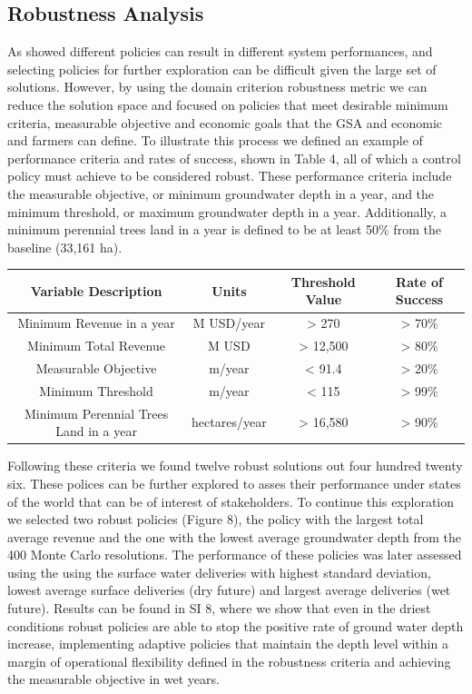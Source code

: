 \documentclass[11pt,a4paper]{article}
\begin{document}
\subsection{Robustness Analysis}

As showed different policies can result in different system performances, and selecting policies for further exploration can be difficult given the large set of solutions. However, by using the domain criterion robustness metric we can reduce the solution space and focused on policies that meet desirable minimum criteria, measurable objective and economic goals that the GSA and economic and farmers can define. To illustrate this process we defined an example of performance criteria and rates of success, shown in Table 4, all of which a control policy must achieve to be considered robust. These performance criteria include the measurable objective, or minimum groundwater depth in a year, and the minimum threshold, or maximum groundwater depth in a year. Additionally, a minimum perennial trees land in a year is defined to be at least 50\% from the baseline (33,161 ha). 

\begin{center}
\begin{tabular}{ |c|c|c|c| }
 \hline
 Variable Description & Units & Threshold Value & Rate of Success \\ 
 \hline
Minimum Revenue in a year  & M USD/year  & > 270 & > 70\% \\
Minimum Total Revenue  & M USD  & > 12,500 & > 80\% \\
Measurable Objective & m/year  & < 91.4 & > 20\%  \\
Minimum Threshold & m/year  & < 115 & > 99\%  \\
Minimum Perennial Trees Land in a year & hectares/year & > 16,580 & > 90\%  \\
\hline
\end{tabular}
\end{center}

Following these criteria we found twelve robust solutions out four hundred twenty six. These polices can be further explored to asses their performance under states of the world that can be of interest of stakeholders. To continue this exploration we selected two robust policies (Figure 8), the policy with the largest total average revenue and the one with the lowest average groundwater depth from the 400 Monte Carlo resolutions.
The performance of these policies was later assessed using the using the surface water deliveries with highest standard deviation, lowest average surface deliveries (dry future) and largest average deliveries (wet future). Results can be found in SI 8, where we show that even in the driest conditions robust policies are able to stop the positive rate of ground water depth increase, implementing adaptive policies that maintain the depth level within a margin of operational flexibility defined in the robustness criteria and achieving the measurable objective in wet years. 
\end{document}
